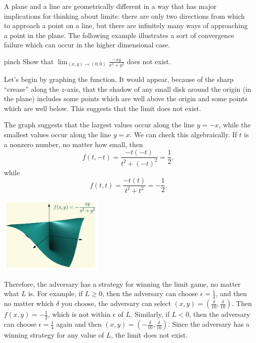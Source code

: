 \documentclass[svgnames]{watsonbook}
\begin{document}
A plane and a line are geometrically different in a way that has major
implications for thinking about limits: there are only two directions
from which to approach a point on a line, but there are infinitely
many ways of approaching a point in the plane. The following example
illustrates a sort of convergence failure which can occur in the
higher dimensional case.

\begin{example}{}{pinch}
    Show that $\displaystyle{\lim_{(x,y) \to
        (0,0)}\frac{-xy}{x^2+y^2}}$ does not exist.
\end{example}

\begin{solution}
  \begin{minipage}{0.7\textwidth}
    Let's begin by graphing the function.  It would appear,
    because of the sharp ``crease'' along the $z$-axis, that the shadow
    of any small disk around the origin (in the plane) includes some
    points which are well above the origin and some points which are
    well below. This suggests that the limit does not exist.

    The graph suggests that the largest values occur along the line
    $y=-x$, while the smallest values occur along the line $y = x$. We
    can check this algebraically. If $t$ is a nonzero number, no
    matter how small, then
    \[
      f(t,-t) = \frac{-t(-t)}{t^2 + (-t)^2} = \frac{1}{2}, 
    \]
    while
    \[
      f(t,t) = \frac{-t(t)}{t^2 + t^2} = -\frac{1}{2}. 
    \]
  \end{minipage}
  \begin{minipage}{0.29\textwidth}
    \includegraphics[width=5cm]{figures/limit}
  \end{minipage}
  
  Therefore, the adversary has a strategy for winning the limit game,
  no matter what $L$ is. For example, if $L \geq 0$, then the
  adversary can choose $\epsilon = \tfrac{1}{4}$, and then no matter
  which $\delta$ you choose, the adversary can select
  $(x,y) = (\frac{\delta}{10}, \frac{\delta}{10})$. Then
  $f(x,y) = -\tfrac{1}{2}$, which is not within $\epsilon$ of
  $L$. Similarly, if $L < 0$, then the adversary can choose $\epsilon
  = \tfrac{1}{4}$ again and then $(x,y) = (-\frac{\delta}{10},
  \frac{\delta}{10})$. Since the adversary has a winning strategy for any value of
  $L$, the limit does not exist.
\end{solution}
\end{document}
